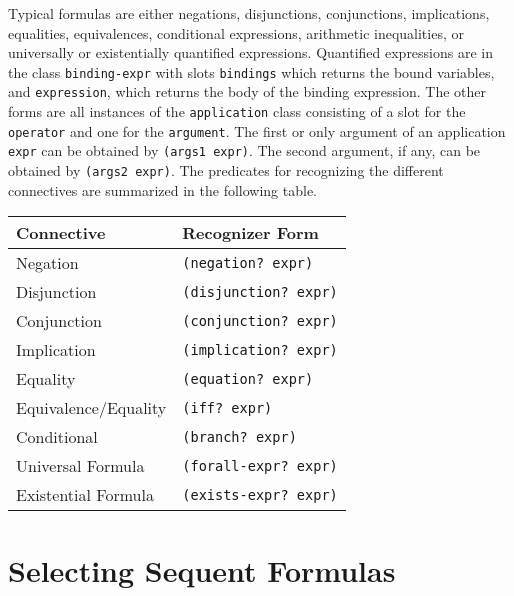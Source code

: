\documentclass[12pt,twoside]{book}
\begin{document}
Typical formulas are either negations, disjunctions, conjunctions,
implications, equalities, equivalences, conditional expressions,
arithmetic inequalities, or  universally or existentially
quantified expressions.  Quantified expressions are in the class 
\texttt{binding-expr} with slots \texttt{bindings} which returns the
bound variables, and \texttt{expression}, which returns the body of
the binding expression.  The other forms are all instances of
the \texttt{application} class consisting of a slot for the
\texttt{operator} and one for the \texttt{argument}.  The first or
only argument of an application \texttt{expr} can be obtained by
\texttt{(args1 expr)}\@.  The second argument, if any, can be obtained
by \texttt{(args2 expr)}\@.   The predicates for recognizing
the different connectives are summarized in the following table.
\begin{center}
\begin{tabular}{|l|l|}
\hline
{\bf Connective} & {\bf Recognizer Form}\\\hline
Negation & \texttt{(negation?\ expr)} \\\hline
Disjunction & \texttt{(disjunction?\ expr)} \\\hline
Conjunction & \texttt{(conjunction?\ expr)} \\\hline
Implication & \texttt{(implication?\ expr)} \\\hline
Equality & \texttt{(equation?\ expr)} \\\hline
Equivalence/Equality & \texttt{(iff?\ expr)} \\\hline
Conditional & \texttt{(branch?\ expr)} \\\hline
Universal Formula & \texttt{(forall-expr?\ expr)} \\\hline
Existential Formula & \texttt{(exists-expr?\ expr)} \\\hline
\end{tabular}
\end{center}


\section{Selecting Sequent Formulas}\label{selection}
\end{document}
